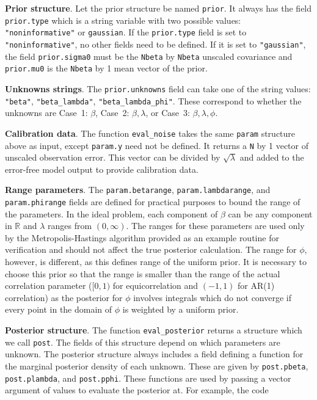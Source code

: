 \documentclass{book}
\begin{document}
\vspace{.1in}
\textbf{Prior structure}. Let the prior structure be named {\tt prior}. It always has the field {\tt prior.type} which is a string variable with
two possible values: {\tt "noninformative"} or {\tt gaussian}. If the {\tt prior.type} field is set to {\tt "noninformative"}, no other
fields need to be defined. If it is set to {\tt "gaussian"}, the field {\tt prior.sigma0} must be the {\tt Nbeta} by {\tt Nbeta}
unscaled covariance and {\tt prior.mu0} is the {\tt Nbeta} by 1 mean vector of the prior. 

\vspace{.1in}
\textbf{Unknowns strings}. The {\tt prior.unknowns} field can take one of the string values:
{\tt "beta"}, {\tt"beta\_lambda"}, {\tt"beta\_lambda\_phi"}. These correspond to whether the unknowns are Case~1: $\beta$, 
Case~2: $\beta, \lambda$, or Case~3: $\beta,\lambda,\phi$. 

\vspace{.1in}
\textbf{Calibration data}. The function {\tt eval\_noise} takes the same {\tt param} structure above as input, except {\tt param.y}
need not be defined. It returns a {\tt N} by 1 vector of unscaled observation error. This vector can be divided by $\sqrt{\lambda}$
and added to the error-free model output to provide calibration data.

\vspace{.1in}
\textbf{Range parameters}. The {\tt param.betarange}, {\tt param.lambdarange}, and {\tt param.phirange} fields are defined
for practical purposes to bound the range of the parameters. In the ideal problem, each component of $\beta$ can be
any component in $\mathbb{R}$ and $\lambda$ ranges from $(0, \infty)$. The ranges for these parameters are used only by the 
Metropolis-Hastings algorithm provided as an example routine for verification and should not affect the true posterior calculation.
The range for $\phi$, however, is different, as this defines range of the uniform prior. It is necessary to choose this prior so that
the range is smaller than the range of the actual correlation parameter ($[0,1)$ for equicorrelation and $(-1, 1)$ for AR(1) 
correlation) as the posterior for $\phi$ involves integrals which do not converge if every point in the domain of $\phi$ is 
weighted by a uniform prior. 

\vspace{.1in}
\textbf{Posterior structure}. The function {\tt eval\_posterior} returns a structure which we call {\tt post}. The fields of
this structure depend on which parameters are unknown. The posterior structure always includes a field defining
a function for the marginal posterior density of each unknown. These are given by {\tt post.pbeta},
{\tt post.plambda}, and {\tt post.pphi}. These functions are used by passing a vector argument of values to evaluate
the posterior at. For example, the code
\end{document}
